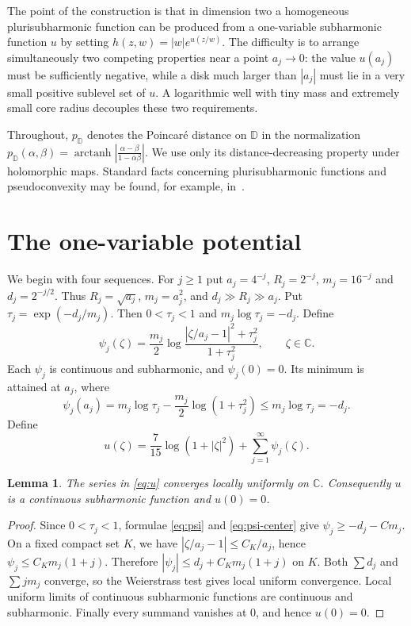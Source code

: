 \documentclass{amsart}
\newcommand{\C}{\mathbb C}
\newcommand{\D}{\mathbb D}
\newtheorem{lemma}[theorem]{Lemma}
\theoremstyle{remark}
\begin{document}
The point of the construction is that in dimension two a homogeneous plurisubharmonic function can be produced from a one-variable subharmonic function $u$ by setting $h(z,w)=|w|e^{u(z/w)}$. The difficulty is to arrange simultaneously two competing properties near a point $a_j\to0$: the value $u(a_j)$ must be sufficiently negative, while a disk much larger than $|a_j|$ must lie in a very small positive sublevel set of $u$. A logarithmic well with tiny mass and extremely small core radius decouples these two requirements.

Throughout, $p_{\D}$ denotes the Poincar\'e distance on $\D$ in the normalization
$p_{\D}(\alpha,\beta)=\operatorname{arctanh}\left|\frac{\alpha-\beta}{1-\overline\alpha\beta}\right|$. We use only its distance-decreasing property under holomorphic maps. Standard facts concerning plurisubharmonic functions and pseudoconvexity may be found, for example, in~\cite{Hormander}.

\section{The one-variable potential}

We begin with four sequences. For $j\ge1$ put $a_j=4^{-j}$, $R_j=2^{-j}$, $m_j=16^{-j}$ and $d_j=2^{-j/2}$. Thus $R_j=\sqrt{a_j}$, $m_j=a_j^2$, and $d_j\gg R_j\gg a_j$. Put $\tau_j=\exp(-d_j/m_j)$. Then $0<\tau_j<1$ and $m_j\log\tau_j=-d_j$. Define
\begin{equation}\label{eq:psi}
 \psi_j(\zeta)=\frac{m_j}{2}\log\frac{|\zeta/a_j-1|^2+\tau_j^2}{1+\tau_j^2},
 \qquad \zeta\in\C.
\end{equation}
Each $\psi_j$ is continuous and subharmonic, and $\psi_j(0)=0$. Its minimum is attained at $a_j$, where
\begin{equation}\label{eq:psi-center}
 \psi_j(a_j)=m_j\log\tau_j-\frac{m_j}{2}\log(1+\tau_j^2)
 \le m_j\log\tau_j=-d_j.
\end{equation}
Define
\begin{equation}\label{eq:u}
 u(\zeta)=\frac7{15}\log(1+|\zeta|^2)+\sum_{j=1}^{\infty}\psi_j(\zeta).
\end{equation}

\begin{lemma}\label{lem:convergence}
The series in \eqref{eq:u} converges locally uniformly on $\C$. Consequently $u$ is a continuous subharmonic function and $u(0)=0$.
\end{lemma}

\begin{proof}
Since $0<\tau_j<1$, formulae \eqref{eq:psi} and \eqref{eq:psi-center} give $\psi_j\ge-d_j-Cm_j$. On a fixed compact set $K$, we have $|\zeta/a_j-1|\le C_K/a_j$, hence $\psi_j\le C_Km_j(1+j)$. Therefore $|\psi_j|\le d_j+C_Km_j(1+j)$ on $K$. Both $\sum d_j$ and $\sum jm_j$ converge, so the Weierstrass test gives local uniform convergence. Local uniform limits of continuous subharmonic functions are continuous and subharmonic. Finally every summand vanishes at $0$, and hence $u(0)=0$.
\end{proof}
\end{document}
